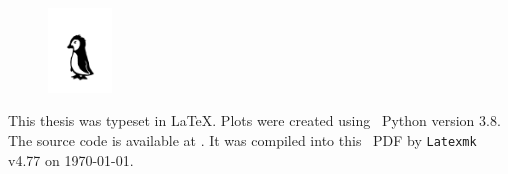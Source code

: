 \documentclass[\relativeRoot/main.tex]{subfiles}
\begin{document}
\printglossary[
    title={Abbreviations},
    type=acronym,
    style=long
]
    
\printbibliography[
    title={Bibliography},
    heading=bibintoc
]

\cleardoublepage
{}
{}
\listoffigures

\cleardoublepage
{}
{}
\listoftables

\vfill

\begin{figure}[h]
    \centering
    \includegraphics[width=0.15\textwidth]{figures/pingu.png}
\end{figure}

This thesis was typeset in \LaTeX. Plots were created using ~Python version 3.8. The source code is available at . It was compiled into this ~PDF by \texttt{Latexmk} v4.77 on \today.
\end{document}
